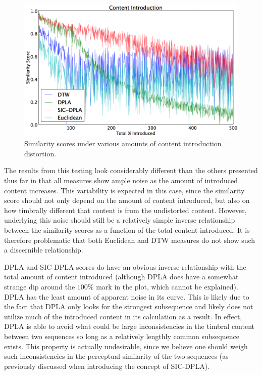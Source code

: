 \documentclass[a4paper,12pt]{report} 	%
\numberwithin{figure}{chapter}
\numberwithin{table}{chapter}
\numberwithin{equation}{chapter}
\begin{document}
\begin{flushleft}
\begin{figure}[h!]
\begin{center}
\includegraphics[scale=0.5,width=\linewidth]{ContentIntroduction}
\caption[Content Introduction Results]{Similarity scores under various amounts of content introduction distortion.}
\end{center}
\end{figure}
The results from this testing look considerably different than the others presented thus far in that all measures show ample noise as the amount of introduced content increases. This variability is expected in this case, since the similarity score should not only depend on the amount of content introduced, but also on how timbrally different that content is from the undistorted content. However, underlying this noise should still be a relatively simple inverse relationship between the similarity scores as a function of the total content introduced. It is therefore problematic that both Euclidean and DTW measures do not show such a discernible relationship.

DPLA and SIC-DPLA scores do have an obvious inverse relationship with the total amount of content introduced (although DPLA does have a somewhat strange dip around the $100\%$ mark in the plot, which cannot be explained). DPLA has the least amount of apparent noise in its curve. This is likely due to the fact that DPLA only looks for the strongest subsequence and likely does not utilize much of the introduced content in its calculation as a result. In effect, DPLA is able to avoid what could be large inconsistencies in the timbral content between two sequences so long as a relatively lengthly common subsequence exists. This property is actually undesirable, since we believe one should weigh such inconsistencies in the perceptual similarity of the two sequences (as previously discussed when introducing the concept of SIC-DPLA).


\end{flushleft}
\end{document}
